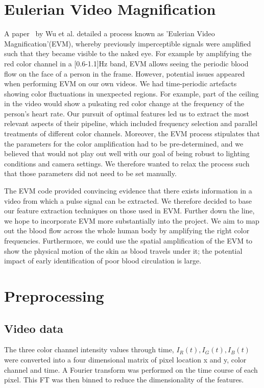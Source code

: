 \documentclass[12pt]{article}
\begin{document}
\section{Eulerian Video Magnification}

A paper~\cite{Wu12Eulerian} by Wu et al. detailed a process known as 'Eulerian Video Magnification'(EVM), whereby previously imperceptible signals were amplified such that they became visible to the naked eye. For example by amplifying the red color channel in a [0.6-1.1]Hz band, EVM allows seeing the periodic blood flow on the face of a person in the frame.
However, potential issues appeared when performing EVM on our own videos. We had time-periodic artefacts showing color fluctuations in unexpected regions. For example, part of the ceiling in the video would show a pulsating red color change at the frequency of the person's heart rate. Our pursuit of optimal features led us to extract the most relevant aspects of their pipeline, which included frequency selection and parallel treatments of different color channels. Moreover, the EVM process stipulates that the parameters for the color amplification had to be pre-determined, and we believed that would not play out well with our goal of being robust to lighting conditions and camera settings. We therefore wanted to relax the process such that those parameters did not need to be set manually.

The EVM code provided convincing evidence that there exists information in a video from which a pulse signal can be extracted. We therefore decided to base our feature extraction techniques on those used in EVM. Further down the line, we hope to incorporate EVM more substantially into the project. We aim to map out the blood flow across the whole human body by amplifying the right color frequencies. Furthermore, we could use the spatial amplification of the EVM to show the physical motion of the skin as blood travels under it; the potential impact of early identification of poor blood circulation is large.


\section{Preprocessing}
\subsection*{Video data}
  The three color channel intensity values through time, \(I_R(t), I_G(t), I_B(t)\) were converted into a four dimensional matrix of pixel location x and y, color channel and time. A Fourier transform was performed on the time course of each pixel.
  This FT was then binned to reduce the dimensionality of the features.
  
\end{document}
